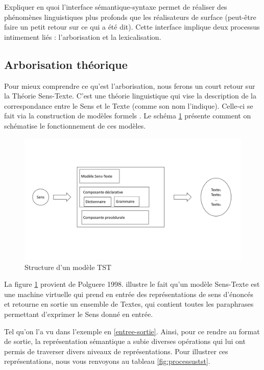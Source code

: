 Expliquer en quoi l'interface sémantique-syntaxe permet de réaliser des phénomènes linguistiques plus profonds que les réalisateurs de surface (peut-être faire un petit retour sur ce qui a été dit). Cette interface implique deux processus intimement liés : l'arborisation et la lexicalisation. 


\subsection{Arborisation théorique}\label{arbo}
Pour mieux comprendre ce qu'est l'arborisation, nous ferons un court retour sur la Théorie Sens-Texte. C'est une théorie linguistique qui vise la description de la correspondance entre le Sens et le Texte (comme son nom l'indique). Celle-ci se fait via la construction de modèles formels \citep{PolgueretheorieSensTexte1998}. Le schéma \ref{fig:modeletst} présente comment on schématise le fonctionnement de ces modèles.

\begin{figure}[htb]
	\centering
	\includegraphics[width=1\textwidth, trim = {0cm 3cm 0cm 3cm},clip]{ch3/figs/polguere1.pdf}
	\caption{Structure d'un modèle TST}
	\label{fig:modeletst}
\end{figure}

La figure \ref{fig:modeletst} provient de Polguere 1998. illustre le fait qu'un modèle Sens-Texte est une machine virtuelle qui prend en entrée des représentations de sens d'énoncés et retourne en sortie un ensemble de Textes, qui contient toutes les paraphrases permettant d'exprimer le Sens donné en entrée. 

Tel qu'on l'a vu dans l'exemple en \ref{entree-sortie}. Ainsi, pour ce rendre au format de sortie, la représentation sémantique a subie diverses opérations qui lui ont permis de traverser divers niveaux de représentations. Pour illustrer ces représentations, nous vous renvoyons au tableau \ref{fig:processustst}.


